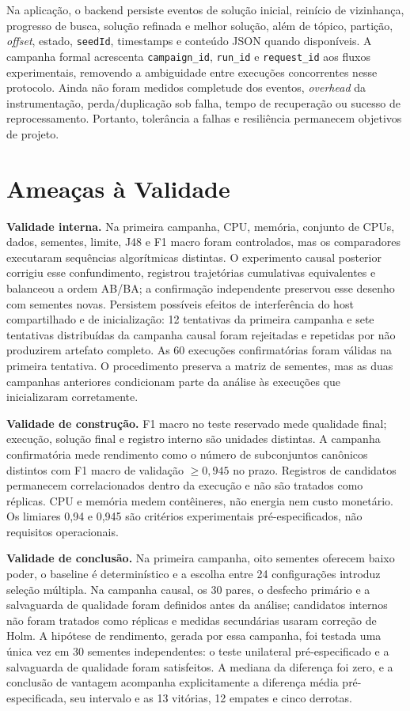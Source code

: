 Na aplicação, o backend persiste eventos de solução inicial, reinício de vizinhança, progresso de busca, solução refinada e melhor solução, além de tópico, partição, \textit{offset}, estado, \texttt{seedId}, timestamps e conteúdo JSON quando disponíveis. A campanha formal acrescenta \texttt{campaign\_id}, \texttt{run\_id} e \texttt{request\_id} aos fluxos experimentais, removendo a ambiguidade entre execuções concorrentes nesse protocolo. Ainda não foram medidos completude dos eventos, \textit{overhead} da instrumentação, perda/duplicação sob falha, tempo de recuperação ou sucesso de reprocessamento. Portanto, tolerância a falhas e resiliência permanecem objetivos de projeto.

\section{Ameaças à Validade}

\textbf{Validade interna.} Na primeira campanha, CPU, memória, conjunto de CPUs, dados, sementes, limite, J48 e F1 macro foram controlados, mas os comparadores executaram sequências algorítmicas distintas. O experimento causal posterior corrigiu esse confundimento, registrou trajetórias cumulativas equivalentes e balanceou a ordem AB/BA; a confirmação independente preservou esse desenho com sementes novas. Persistem possíveis efeitos de interferência do host compartilhado e de inicialização: 12 tentativas da primeira campanha e sete tentativas distribuídas da campanha causal foram rejeitadas e repetidas por não produzirem artefato completo. As 60 execuções confirmatórias foram válidas na primeira tentativa. O procedimento preserva a matriz de sementes, mas as duas campanhas anteriores condicionam parte da análise às execuções que inicializaram corretamente.

\textbf{Validade de construção.} F1 macro no teste reservado mede qualidade final; execução, solução final e registro interno são unidades distintas. A campanha confirmatória mede rendimento como o número de subconjuntos canônicos distintos com F1 macro de validação $\geq 0{,}945$ no prazo. Registros de candidatos permanecem correlacionados dentro da execução e não são tratados como réplicas. CPU e memória medem contêineres, não energia nem custo monetário. Os limiares 0,94 e 0,945 são critérios experimentais pré-especificados, não requisitos operacionais.

\textbf{Validade de conclusão.} Na primeira campanha, oito sementes oferecem baixo poder, o baseline é determinístico e a escolha entre 24 configurações introduz seleção múltipla. Na campanha causal, os 30 pares, o desfecho primário e a salvaguarda de qualidade foram definidos antes da análise; candidatos internos não foram tratados como réplicas e medidas secundárias usaram correção de Holm. A hipótese de rendimento, gerada por essa campanha, foi testada uma única vez em 30 sementes independentes: o teste unilateral pré-especificado e a salvaguarda de qualidade foram satisfeitos. A mediana da diferença foi zero, e a conclusão de vantagem acompanha explicitamente a diferença média pré-especificada, seu intervalo e as 13 vitórias, 12 empates e cinco derrotas.

